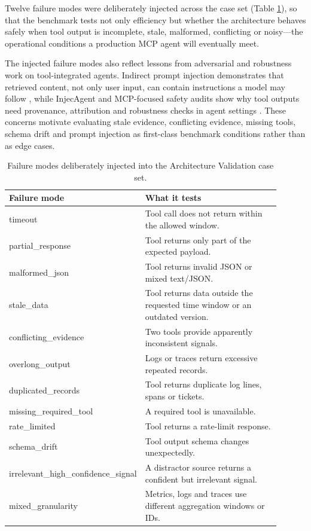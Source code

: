 Twelve failure modes were deliberately injected across the case set (Table \ref{tab:failuremodes}), so that the benchmark tests not only efficiency but whether the architecture behaves safely when tool output is incomplete, stale, malformed, conflicting or noisy---the operational conditions a production MCP agent will eventually meet.

The injected failure modes also reflect lessons from adversarial and robustness work on tool-integrated agents. Indirect prompt injection demonstrates that retrieved content, not only user input, can contain instructions a model may follow \cite{Greshake2023}, while InjecAgent and MCP-focused safety audits show why tool outputs need provenance, attribution and robustness checks in agent settings \cite{Zhan2024, Radosevich2025}. These concerns motivate evaluating stale evidence, conflicting evidence, missing tools, schema drift and prompt injection as first-class benchmark conditions rather than as edge cases.

\begin{table}[!htb]
  \caption{Failure modes deliberately injected into the Architecture Validation case set.}
  \label{tab:failuremodes}
  \small
  \begin{tabular}{p{0.40\linewidth}p{0.50\linewidth}}
    \toprule
    \textbf{Failure mode} & \textbf{What it tests} \\
    \midrule
    timeout & Tool call does not return within the allowed window. \\
    partial\allowbreak\_response & Tool returns only part of the expected payload. \\
    malformed\allowbreak\_json & Tool returns invalid JSON or mixed text/JSON. \\
    stale\allowbreak\_data & Tool returns data outside the requested time window or an outdated version. \\
    conflicting\allowbreak\_evidence & Two tools provide apparently inconsistent signals. \\
    overlong\allowbreak\_output & Logs or traces return excessive repeated records. \\
    duplicated\allowbreak\_records & Tool returns duplicate log lines, spans or tickets. \\
    missing\allowbreak\_required\allowbreak\_tool & A required tool is unavailable. \\
    rate\allowbreak\_limited & Tool returns a rate-limit response. \\
    schema\allowbreak\_drift & Tool output schema changes unexpectedly. \\
    irrelevant\allowbreak\_high\allowbreak\_confidence\allowbreak\_signal & A distractor source returns a confident but irrelevant signal. \\
    mixed\allowbreak\_granularity & Metrics, logs and traces use different aggregation windows or IDs. \\
    \bottomrule
  \end{tabular}
\end{table}

